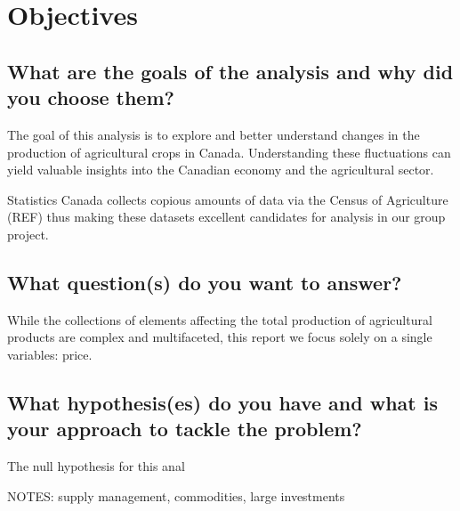 \section{Objectives}

\subsection{What are the goals of the analysis and why did you choose them?}

The goal of this analysis is to explore and better understand changes in the production of agricultural crops in Canada.
Understanding these fluctuations can yield valuable insights into the Canadian economy and the agricultural sector.

Statistics Canada collects copious amounts of data via the Census of Agriculture (REF) thus making these datasets excellent candidates for analysis in our group project.

\subsection{What question(s) do you want to answer?}

While the collections of elements affecting the total production of agricultural products are complex and multifaceted, this report we focus solely on a single variables: price.


\subsection{What hypothesis(es) do you have and what is your approach to tackle the problem?}

The null hypothesis for this anal

NOTES: supply management, commodities, large investments